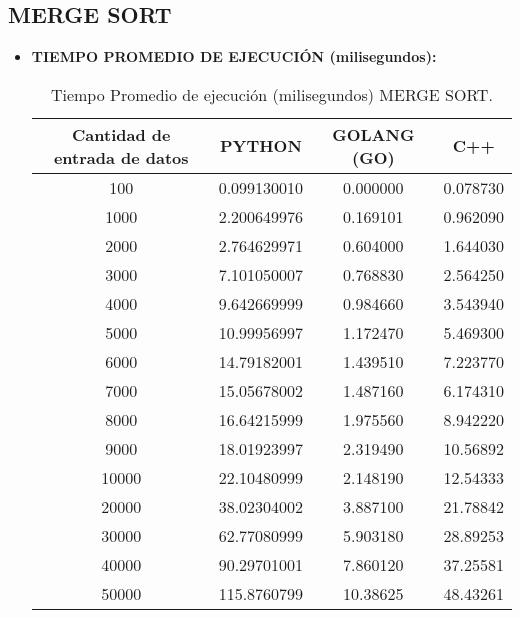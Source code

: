 \documentclass{article}
\begin{document}
\subsection{MERGE SORT}
    \begin{itemize}
      \item \textbf{TIEMPO PROMEDIO DE EJECUCIÓN (milisegundos):}
        \begin{table}[H]
            \centering
            \begin{tabular}{||c c c c||} 
              \hline
              \textbf{Cantidad de entrada de datos} & \textbf{PYTHON} & \textbf{GOLANG (GO)} & \textbf{C++} \\ [0.5ex] 
              \hline\hline
              100    &  0.099130010  &  0.000000  &  0.078730  \\ [0.5ex]
              1000   &  2.200649976  &  0.169101  &  0.962090  \\ [0.5ex]
              2000   &  2.764629971  &  0.604000  &  1.644030  \\ [0.5ex]
              3000   &  7.101050007  &  0.768830  &  2.564250  \\ [0.5ex]
              4000   &  9.642669999  &  0.984660  &  3.543940  \\ [0.5ex]
              5000   &  10.99956997  &  1.172470  &  5.469300  \\ [0.5ex]
              6000   &  14.79182001  &  1.439510  &  7.223770  \\ [0.5ex]
              7000   &  15.05678002  &  1.487160  &  6.174310  \\ [0.5ex]
              8000   &  16.64215999  &  1.975560  &  8.942220  \\ [0.5ex]
              9000   &  18.01923997  &  2.319490  &  10.56892  \\ [0.5ex]
              10000  &  22.10480999  &  2.148190  &  12.54333  \\ [0.5ex]
              20000  &  38.02304002  &  3.887100  &  21.78842  \\ [0.5ex]
              30000  &  62.77080999  &  5.903180  &  28.89253  \\ [0.5ex]
              40000  &  90.29701001  &  7.860120  &  37.25581  \\ [0.5ex]
              50000  &  115.8760799  &  10.38625  &  48.43261  \\ [0.5ex]
              \hline
            \end{tabular}
            \caption{Tiempo Promedio de ejecución (milisegundos) MERGE SORT.}
            \label{table:tiempoPromedioMergeSort}
        \end{table}


\end{itemize}
\end{document}
